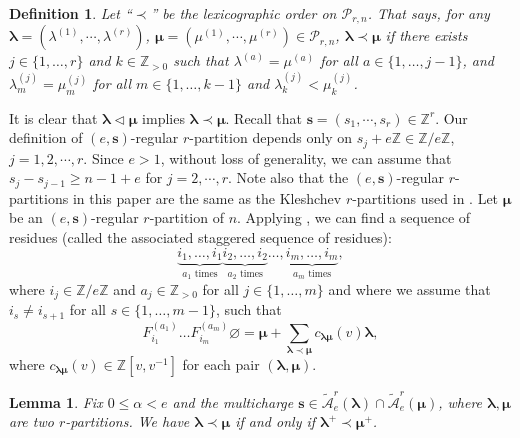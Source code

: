 \documentclass[a4paper,10pt]{amsart}
\theoremstyle{plain}
\newcommand{\bvarnothing}{{\boldsymbol \varnothing}}
\def\bs{{\boldsymbol{s}}}
\def\Z{{\mathbb Z}}
\def\PP{\mathscr{P}}
\def\blam{{\boldsymbol \lambda}}
\def\bmu{{\boldsymbol \mu}}
\theoremstyle{plain}
\newtheorem{lemma}[theorem]{Lemma}
\newtheorem{dfn}[theorem]{Definition}
\numberwithin{equation}{section}
\begin{document}
\begin{dfn} Let ``$\prec$'' be the lexicographic order on $\PP_{r,n}$. That says, for any $\blam=(\lambda^{(1)},\cdots,\lambda^{(r)})$, $\bmu=(\mu^{(1)},\cdots,\mu^{(r)})\in\PP_{r,n}$, $\blam\prec\bmu$ if there exists $j\in \{1,\ldots,r\}$ and $k\in \mathbb{Z}_{>0}$ such that $\lambda^{(a)}=\mu^{(a)}$ for all $a\in \{1,\ldots,j-1\}$, and $\lambda^{(j)}_m=\mu^{(j)}_m$ for all $m\in \{1,\ldots,k-1\}$ and $\lambda^{(j)}_k<\mu^{(j)}_k$.
\end{dfn}
It is clear that $\blam \lhd \bmu$ implies $\blam\prec\bmu$. Recall that $\bs=(s_1,\cdots,s_r)\in\Z^r$. Our definition of $(e,\bs)$-regular $r$-partition depends only on $s_j+e\Z\in\Z/e\Z$, $j=1,2,\cdots,r$. Since $e>1$, without loss of generality, we can assume that $s_j-s_{j-1}\ge n-1+e$ for $j=2, \cdots, r$. Note also that the $(e,\bs)$-regular $r$-partitions in this paper are the same as the Kleshchev $r$-partitions used in \cite{J}.
Let $\bmu$ be an $(e,\bs)$-regular $r$-partition of $n$. Applying \cite[\S10]{J}, we can find a sequence of residues (called the associated staggered sequence of residues): $$
\underbrace{{i}_1,\ldots,{i}_{1}}_{a_1\text{ times}}  \underbrace{{i}_2,\ldots,{i}_{2}}_{a_2\text{ times}} \ldots, \underbrace{{i}_m,\ldots,{i}_{m}}_{a_m\text{ times}}, $$
where ${i}_{j}\in \mathbb{Z}/e\mathbb{Z}$ and $a_j\in \mathbb{Z}_{>0}$ for all $j\in \{1,\ldots,m\}$ and where we assume that ${i}_s \neq {i}_{s+1}$ for all $s\in \{1,\ldots,m-1\}$, such that $$
F_{{i}_1}^{(a_1)}\ldots F_{{i}_m}^{(a_m)}\bvarnothing =\bmu + \sum_{\blam\prec\bmu}  c_{\blam \bmu} (v) \blam,$$
where $c_{\blam\bmu} (v)\in\Z[v,v^{-1}]$ for each pair $(\blam,\bmu)$.

\begin{lemma}\label{4.9}
Fix $0\leq \alpha<e$ and the multicharge $\bs\in\tilde{\mathcal A}^r_e(\blam)\cap\tilde{\mathcal A}^r_e(\bmu)$, where $\blam,\bmu$ are two $r$-partitions. We have $\blam \prec \bmu$ if and only if $\blam^+ \prec \bmu^+$.
\end{lemma}
\end{document}

